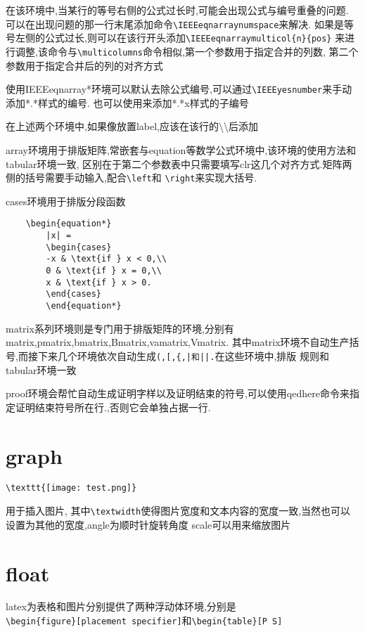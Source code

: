 \documentclass[a4paper,11pt]{article}%
\begin{document}
在该环境中,当某行的等号右侧的公式过长时,可能会出现公式与编号重叠的问题.
可以在出现问题的那一行末尾添加命令\verb+\IEEEeqnarraynumspace+来解决.
如果是等号左侧的公式过长,则可以在该行开头添加\verb+\IEEEeqnarraymulticol{n}{pos}+
来进行调整,该命令与\verb+\multicolumns+命令相似,第一个参数用于指定合并的列数,
第二个参数用于指定合并后的列的对齐方式

使用IEEEeqnarray*环境可以默认去除公式编号,可以通过\verb+\IEEEyesnumber+来手动添加*.*样式的编号.
也可以使用\IEEEyessubnumber 来添加*.*x样式的子编号

在上述两个环境中,如果像放置label,应该在该行的\textbackslash\textbackslash 后添加

array环境用于排版矩阵,常嵌套与equation等数学公式环境中,该环境的使用方法和tabular环境一致,
区别在于第二个参数表中只需要填写clr这几个对齐方式.矩阵两侧的括号需要手动输入,配合\verb+\left+和
\verb+\right+来实现大括号.

cases环境用于排版分段函数
\begin{verbatim}
    \begin{equation*}
        |x| =
        \begin{cases}
        -x & \text{if } x < 0,\\
        0 & \text{if } x = 0,\\
        x & \text{if } x > 0.
        \end{cases}
        \end{equation*}
\end{verbatim}

matrix系列环境则是专门用于排版矩阵的环境,分别有matrix,pmatrix,bmatrix,Bmatrix,vamatrix,Vmatrix.
其中matrix环境不自动生产括号,而接下来几个环境依次自动生成\verb-(,[,{,|和||.-在这些环境中,排版
规则和tabular环境一致

proof环境会帮忙自动生成证明字样以及证明结束的符号,可以使用qedhere命令来指定证明结束符号所在行.,否则它会单独占据一行.
\section{graph}
\verb+\texttt{[image: test.png]}+

用于插入图片,
其中\verb+\textwidth+使得图片宽度和文本内容的宽度一致,当然也可以设置为其他的宽度,angle为顺时针旋转角度
scale可以用来缩放图片

\section{float}
latex为表格和图片分别提供了两种浮动体环境,分别是\\\verb+\begin{figure}[placement specifier]+和\verb+\begin{table}[P S]+
\end{document}
